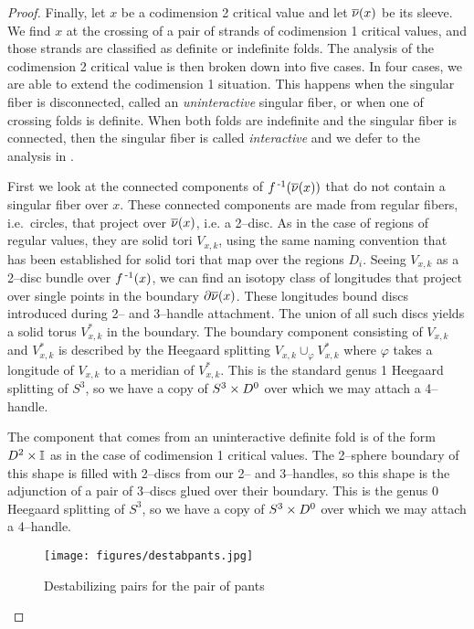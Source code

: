 \begin{proof}
	
	Finally, let $x$ be a codimension 2 critical value and let $\overline{\nu}(x)$ be its sleeve.
	We find $x$ at the crossing of a pair of strands of codimension 1 critical values, and those strands are classified as definite or indefinite folds.
	The analysis of the codimension 2 critical value is then broken down into five cases.
	In four cases, we are able to extend the codimension 1 situation.
	This happens when the singular fiber is disconnected, called an \emph{uninteractive} singular fiber, or when one of crossing folds is definite.
	When both folds are indefinite and the singular fiber is connected, then the singular fiber is called \emph{interactive} and we defer to the analysis in \cite{CostThur08}.
	
	First we look at the connected components of $f^{\,\text{-}1}(\overline{\nu}(x))$ that do not contain a singular fiber over $x$.
	These connected components are made from regular fibers, i.e.\ circles, that project over $\overline{\nu}(x)$, i.e. a 2--disc.
	As in the case of regions of regular values, they are solid tori $V_{x,k}$, using the same naming convention that has been established for solid tori that map over the regions $D_i$.
	Seeing $V_{x,k}$ as a 2--disc bundle over $f^{\,\text{-}1}(x)$, we can find an isotopy class of longitudes that project over single points in the boundary $\partial\overline{\nu}(x)$.
	These longitudes bound discs introduced during 2-- and 3--handle attachment.
	The union of all such discs yields a solid torus $V_{x,k}^*$ in the boundary.
	The boundary component consisting of $V_{x,k}$ and $V_{x,k}^*$ is described by the Heegaard splitting $V_{x,k}\cup_\varphi V_{x,k}^*$ where $\varphi$ takes a longitude of $V_{x,k}$ to a meridian of $V_{x,k}^*$.
	This is the standard genus 1 Heegaard splitting of $S^3$, so we have a copy of $S^3\times D^0$ over which we may attach a 4--handle.

	The component that comes from an uninteractive definite fold is of the form $D^2\times\mathbb{I}$ as in the case of codimension 1 critical values.
	The 2--sphere boundary of this shape is filled with 2--discs from our 2-- and 3--handles, so this shape is the adjunction of a pair of 3--discs glued over their boundary.
	This is the genus 0 Heegaard splitting of $S^3$, so we have a copy of $S^3\times D^0$ over which we may attach a 4--handle.
		
	\begin{figure}
		\centering
		\caption{Destabilizing pairs for the pair of pants}
		\texttt{[image: figures/destabpants.jpg]}
		\label{fig:destabpants}
	\end{figure}
		

\end{proof}
